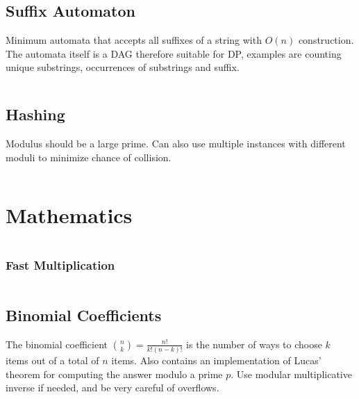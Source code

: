 \documentclass[8pt,a4paper,landscape,oneside]{amsart}
\newcommand{\code}[1]{\inputminted[fontsize=\normalsize,baselinestretch=1]{cpp}{_code/#1}}
\newif\ifverbose
\begin{document}
\begin{multicols*}{3}
    \subsection{Suffix Automaton}
        Minimum automata that accepts all suffixes of a string with $O(n)$
        construction. The automata itself is a DAG therefore suitable for DP,
        examples are counting unique substrings, occurrences of substrings and
        suffix.
        \code{strings/suffix_automaton.cpp}

    \subsection{Hashing}
        Modulus should be a large prime. Can also use multiple instances with
        different moduli to minimize chance of collision.
        \code{strings/hasher.cpp}

\section{Mathematics}
    \ifverbose
    \subsection{Fraction}
        A fraction (rational number) class. Note that numbers are stored in
        lowest common terms.
        \code{mathematics/fraction.cpp}
    \fi

    \ifverbose
    \subsection{Big Integer}
        \ifverbose
        A big integer class.
        \fi
        \code{mathematics/intx.cpp}

        \subsubsection{Fast Multiplication}
            \ifverbose
            Fast multiplication for the big integer using Fast Fourier Transform.
            \fi
            \code{mathematics/fastmul.cpp}
    \fi

    \subsection{Binomial Coefficients}
        The binomial coefficient $\binom{n}{k} = \frac{n!}{k!(n-k)!}$ is the
        number of ways to choose $k$ items out of a total of $n$ items. Also
        contains an implementation of Lucas' theorem for computing the answer
        modulo a prime $p$. Use modular multiplicative inverse if needed, and
        be very careful of overflows.
        \code{mathematics/nck.cpp}


\end{multicols*}
\end{document}
